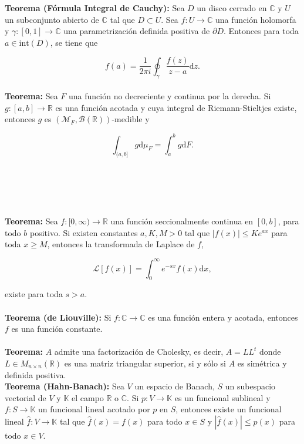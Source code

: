 \documentclass[a4paper,11pt, twocolumn]{article}
\newcommand{\RR}{\mathbb{R}}
\newcommand{\1}{\mathbbm{1}}
\begin{document}
\textbf{Teorema (Fórmula Integral de Cauchy):} Sea $D$ un disco cerrado en $\mathbb C$ y $U$ un subconjunto abierto de $\mathbb C$ tal que $D\subset U$. Sea $f:U\rightarrow \mathbb C$ una función holomorfa y $\gamma:[0,1] \to \mathbb C$ una parametrización definida positiva de $\partial D$. Entonces para toda $a\in \mathrm{int}(D)$, se tiene que

\[f(a) = \dfrac{1}{2\pi i}\oint_\gamma \frac{f(z)}{z-a}\mathrm{d}z.\]\\

\textbf{Teorema:} Sea $F$ una función no decreciente y continua por la derecha. Si $g:[a,b]\to \mathbb{R}$ es una función acotada y cuya integral de Riemann-Stieltjes existe, entonces $g$ es $(\mathcal{M}_F,\mathcal{B}(\mathbb{R}))$-medible y 

\[\int_{(a,b]}g\mathrm d \mu_F = \int_a^b g\mathrm d F.\]\\\\\\\\\\

\textbf{Teorema:} Sea $f:[0,\infty)\to \mathbb{R}$ una función seccionalmente continua en $[0,b]$, para todo $b$ positivo. Si existen constantes $a,K,M>0$ tal que $|f(x)|\leq Ke^{ax}$ para toda $x\geq M$, entonces la transformada de Laplace de $f$, 

\[\mathcal L [f(x)] = \int_0^\infty e^{-sx}f(x)\mathrm dx,\]

existe para toda $s>a.$\\\\

\textbf{Teorema (de Liouville):} Si $f:\mathbb C\to \mathbb C$ es una función entera y acotada, entonces $f$ es una función constante.\\\\

\textbf{Teorema:} $A$ admite una factorización de Cholesky, es decir, $A = LL^t$ donde $L\in M_{n\times n}(\RR)$ es una matriz triangular superior, si y sólo si $A$ es simétrica y definida positiva.\\

\textbf{Teorema (Hahn-Banach):} Sea $V$ un espacio de Banach, $S$ un subespacio vectorial de $V$ y $\mathbb K$ el campo $\mathbb R$ o $\mathbb C$. Si $p:V\to \mathbb K$ es un funcional sublineal y $f:S\to \mathbb K$ un funcional lineal acotado por $p$ en $S$, entonces existe un funcional lineal $\widehat f: V\to \mathbb K$ tal que $\widehat f(x) = f(x)$ para todo $x\in S$ y $|\widehat f(x)|\leq p(x)$ para todo $x\in V$. \\\\
\end{document}
